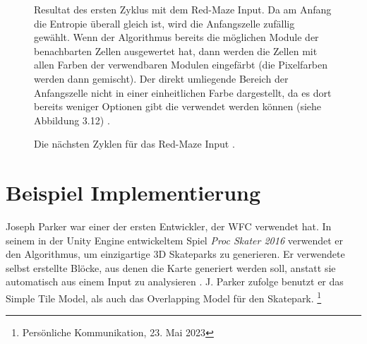 \documentclass[12pt, a4paper,twoside,openright]{report} %
\begin{document}
\begin{figure}[H]
    \centering
    \caption{
        Resultat des ersten Zyklus mit dem Red-Maze Input. Da am Anfang die Entropie überall gleich ist, wird die Anfangszelle zufällig gewählt.
        Wenn der Algorithmus bereits die möglichen Module der benachbarten Zellen ausgewertet hat, dann werden die Zellen mit allen Farben der verwendbaren Modulen eingefärbt
        {(die Pixelfarben werden dann gemischt)}.
        Der direkt umliegende Bereich der Anfangszelle nicht in einer einheitlichen Farbe dargestellt, da es dort bereits weniger Optionen gibt die verwendet werden können
        {(siehe Abbildung 3.12)} \cite{Karth2017WaveFunctionCollapseIC}.
    }%
\end{figure}

\begin{figure}[H]
    \centering
    \caption{Die nächsten Zyklen für das Red-Maze Input \cite{Karth2017WaveFunctionCollapseIC}.}%
\end{figure}

\section{Beispiel Implementierung}

Joseph Parker war einer der ersten Entwickler, der WFC verwendet hat.
In seinem in der Unity Engine entwickeltem Spiel \textit{Proc Skater 2016} verwendet er den Algorithmus, um einzigartige 3D Skateparks zu generieren.
Er verwendete selbst erstellte Blöcke, aus denen die Karte generiert werden soll, anstatt sie automatisch aus einem Input zu analysieren \cite{procskater2016}.
J. Parker zufolge benutzt er das Simple Tile Model, als auch das Overlapping Model für den Skatepark. \footnote[5]{Persönliche Kommunikation, 23. Mai 2023}
\end{document}

